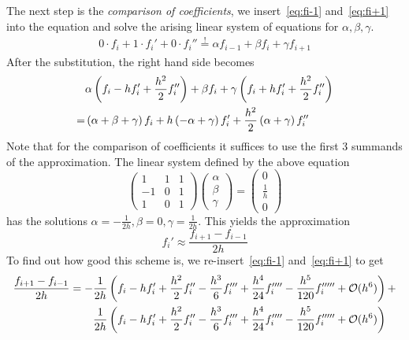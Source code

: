 The next step is the \textit{comparison of coefficients}, we insert~\eqref{eq:fi-1} and~\eqref{eq:fi+1}
into the equation and solve the arising linear system of equations for $\alpha,\beta,\gamma$.
\begin{align}
    0\cdot f_i + 1\cdot f_i' + 0\cdot f_i'' \overset{!}{=} \alpha f_{i-1} + \beta f_i + \gamma
    f_{i+1}
\end{align}
After the substitution, the right hand side becomes
\begin{align}
    &\alpha \left(f_i - hf_i' + \frac{h^2}{2}f_i''\right) + \beta f_i + \gamma\left(f_i + hf_i' + \frac{h^2}{2}f_i''\right)\notag\\
    = &\left(\alpha+\beta+\gamma\right)f_i + h\left(-\alpha+\gamma\right)f_i' + \frac{h^2}{2}\left(\alpha+\gamma\right)f_i''
\end{align} 
Note that for the comparison of coefficients it suffices to use the first 3 summands of the
approximation.
The linear system defined by the above equation
\begin{equation}
    \begin{pmatrix}
        1&1&1\\
        -1&0&1\\
        1&0&1
    \end{pmatrix}
    \begin{pmatrix}
        \alpha\\
        \beta\\
        \gamma
    \end{pmatrix}
    =
    \begin{pmatrix}
        0\\
        \frac{1}{h}\\
        0
    \end{pmatrix}
\end{equation}
has the solutions $\alpha = -\frac{1}{2h}, \beta = 0, \gamma = \frac{1}{2h}$.
This yields the approximation 
\begin{equation}
    f_i'\approx\frac{f_{i+1} - f_{i-1}}{2h}
\end{equation}
To find out how good this scheme is, we re-insert~\eqref{eq:fi-1} and~\eqref{eq:fi+1} to get
\begin{align}
    \frac{f_{i+1} - f_{i-1}}{2h}= -&\frac{1}{2h}\left(f_i - hf_i' + \frac{h^2}{2}f_i'' - \frac{h^3}{6}f_i''' + \frac{h^4}{24}f_i'''' -
    \frac{h^5}{120}f_i''''' + \mathcal{O}(h^6)\right) + \notag\\
     &\frac{1}{2h}\left(f_i - hf_i' + \frac{h^2}{2}f_i'' - \frac{h^3}{6}f_i''' + \frac{h^4}{24}f_i'''' -
    \frac{h^5}{120}f_i''''' + \mathcal{O}(h^6)\right)\notag
\end{align}
